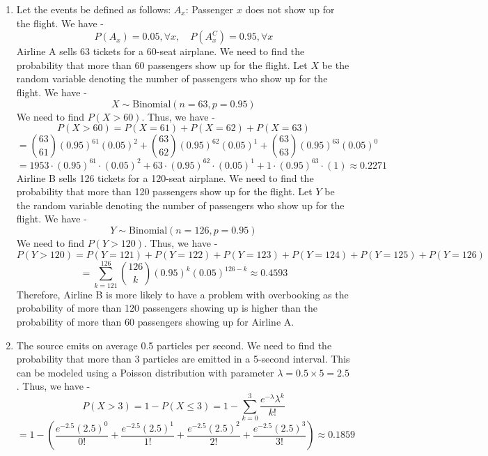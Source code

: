 \begin{enumerate}
    Thus, we have -
    \[k \sum_{i=1}^{\infty} \left(\frac{1}{i} - \frac{1}{i+1}\right) = 1\]
    This is a telescoping series, and we have -
    \[k \left(1 - \lim_{n \to \infty} \frac{1}{n+1}\right) = 1\]
    \[k \cdot 1 = 1\]
    \[\boxed{k = 1
    }\]
    Therefore the pmf of $X$ is given by -
    \[P(X = i) = \frac{1}{i(i+1)}, \quad i \in \mathbb{N}\]
    We need to calculate $P(3 \leq X < 6)$. Thus, we have -
    \[P(3 \leq X < 6) = P(X=3) + P(X=4) + P(X=5)\]
    \[= \frac{1}{3 \cdot 4} + \frac{1}{4 \cdot 5} + \frac{1}{5 \cdot 6}\]
    \[\boxed{= \frac{1}{12} + \frac{1}{20} + \frac{1}{30} = \frac{5}{60} + \frac{3}{60} + \frac{2}{60} = \frac{10}{60} = \frac{1}{6}
    }\]
    \item Let the events be defined as follows:
    $A_x$: Passenger $x$ does not show up for the flight. 
    We have - 
    $$P(A_x) = 0.05, \forall x, \quad P(A_x^C) = 0.95, \forall x$$
    Airline A sells 63 tickets for a 60-seat airplane. We need to find the probability that more than 60 passengers show up for the flight. Let $X$ be the random variable denoting the number of passengers who show up for the flight. We have -
    \[X \sim \text{Binomial}(n=63, p=0.95)\]
    We need to find $P(X > 60)$. Thus, we have -
    \[P(X > 60) = P(X=61) + P(X=62) + P(X=63)\]
    \[= \binom{63}{61} (0.95)^{61} (0.05)^{2} + \binom{63}{62} (0.95)^{62} (0.05)^{1} + \binom{63}{63} (0.95)^{63} (0.05)^{0}\]
    \[\boxed{= 1953 \cdot (0.95)^{61} \cdot (0.05)^{2} + 63 \cdot (0.95)^{62} \cdot (0.05)^{1} + 1 \cdot (0.95)^{63} \cdot (1) \approx 0.2271
    }\]
    Airline B sells 126 tickets for a 120-seat airplane. We need to find the probability that more than 120 passengers show up for the flight. Let $Y$ be the random variable denoting the number of passengers who show up for the flight. We have -
    \[Y \sim \text{Binomial}(n=126, p=0.95)\]
    We need to find $P(Y > 120)$. Thus, we have -
    \[P(Y > 120) = P(Y=121) + P(Y=122) + P(Y=123) + P(Y=124) + P(Y=125) + P(Y=126)\]
    \[\boxed{= \sum_{k=121}^{126} \binom{126}{k} (0.95)^{k} (0.05)^{126-k}\approx 0.4593
    }\]
    Therefore, Airline B is more likely to have a problem with overbooking as the probability of more than 120 passengers showing up is higher than the probability of more than 60 passengers showing up for Airline A.
    \item The source emits on average 0.5 particles per second. We need to find the probability that more than 3 particles are emitted in a 5-second interval. This can be modeled using a Poisson distribution with parameter $\lambda = 0.5 \times 5 = 2.5$. Thus, we have -
    \[P(X > 3) = 1 - P(X \leq 3) = 1 - \sum_{k=0}^{3} \frac{e^{-\lambda} \lambda^k}{k!}\]
    \[\boxed{= 1 - \left(\frac{e^{-2.5} (2.5)^0}{0!} + \frac{e^{-2.5} (2.5)^1}{1!} + \frac{e^{-2.5} (2.5)^2}{2!} + \frac{e^{-2.5} (2.5)^3}{3!}\right) \approx 0.1859
    }\]
    \end{enumerate}
